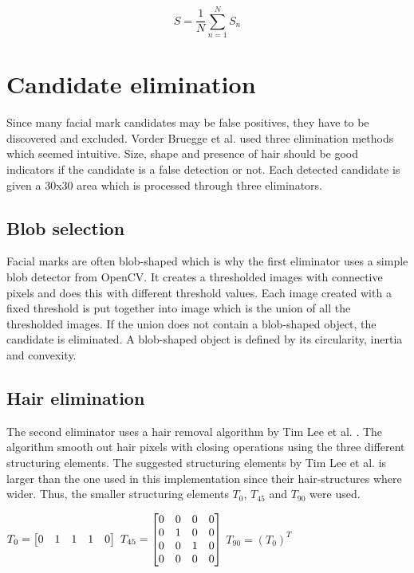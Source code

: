 \begin{equation} \label{eq:S_total}
S =\frac{1}{N} \sum_{n=1}^{N} S_n
\end{equation}



\section{Candidate elimination} \label{sec:elimination} 

Since many facial mark candidates may be false positives, they have to be discovered and excluded. Vorder Bruegge et al. \cite{automatic_detector_2015} used three elimination methods which seemed intuitive. Size, shape and presence of hair should be good indicators if the candidate is a false detection or not. Each detected candidate is given a 30x30 area which is processed through three eliminators. 

\subsection{Blob selection} \label{subsec:blob_eli} 

Facial marks are often blob-shaped which is why the first eliminator uses a simple blob detector from OpenCV. It creates a thresholded images with connective pixels and does this with different threshold values. Each image created with a fixed threshold is put together into image which is the union of all the thresholded images. If the union does not contain a blob-shaped object, the candidate is eliminated. A blob-shaped object is defined by its circularity, inertia and convexity.  

\subsection{Hair elimination} \label{subsec:hair_eli} 

The second eliminator uses a hair removal algorithm by Tim Lee et al. \cite{dullrazor}. The algorithm smooth out hair pixels with closing operations using the three different structuring elements. The suggested structuring elements by Tim Lee et al. is larger than the one used in this implementation since their hair-structures where wider. Thus, the smaller structuring elements $T_{0}$, $T_{45}$ and $T_{90}$ were used. \\

\begin{center}
	$T_{0} =
	\left[ \begin{array}{@{}*{5}{c}@{}}
	0 & 1 & 1 & 1 & 0  \\
	\end{array} \right]  $ \quad $T_{45} =
	\left[ \begin{array}{@{}*{4}{c}@{}}
	0 & 0 & 0 & 0 \\
	0 & 1 & 0 & 0 \\
	0 & 0 & 1 & 0 \\
	0 & 0 & 0 & 0  \\
	\end{array} \right]$ \quad $T_{90} = (T_{0})^{T} $ \\
\end{center}

